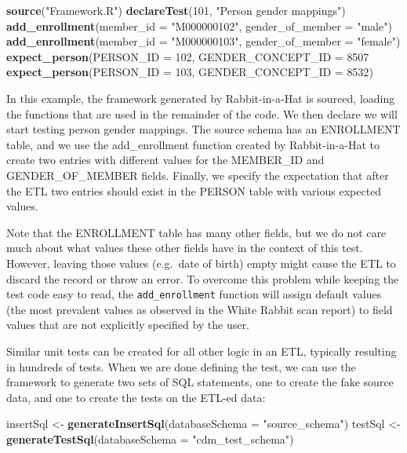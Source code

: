 \documentclass[11pt]{book}
\newenvironment{Shaded}{\begin{snugshade}}{\end{snugshade}}
\newcommand{\KeywordTok}[1]{\textcolor[rgb]{0.13,0.29,0.53}{\textbf{#1}}}
\newcommand{\DataTypeTok}[1]{\textcolor[rgb]{0.13,0.29,0.53}{#1}}
\newcommand{\DecValTok}[1]{\textcolor[rgb]{0.00,0.00,0.81}{#1}}
\newcommand{\StringTok}[1]{\textcolor[rgb]{0.31,0.60,0.02}{#1}}
\newcommand{\NormalTok}[1]{#1}
\theoremstyle{definition}
\theoremstyle{definition}
\theoremstyle{definition}
\theoremstyle{remark}
\begin{document}
\begin{Shaded}
\begin{Highlighting}[]
\KeywordTok{source}\NormalTok{(}\StringTok{"Framework.R"}\NormalTok{)}
\KeywordTok{declareTest}\NormalTok{(}\DecValTok{101}\NormalTok{, }\StringTok{"Person gender mappings"}\NormalTok{)}
\KeywordTok{add_enrollment}\NormalTok{(}\DataTypeTok{member_id =} \StringTok{"M000000102"}\NormalTok{, }\DataTypeTok{gender_of_member =} \StringTok{"male"}\NormalTok{)}
\KeywordTok{add_enrollment}\NormalTok{(}\DataTypeTok{member_id =} \StringTok{"M000000103"}\NormalTok{, }\DataTypeTok{gender_of_member =} \StringTok{"female"}\NormalTok{)}
\KeywordTok{expect_person}\NormalTok{(}\DataTypeTok{PERSON_ID =} \DecValTok{102}\NormalTok{, }\DataTypeTok{GENDER_CONCEPT_ID =} \DecValTok{8507}
\KeywordTok{expect_person}\NormalTok{(}\DataTypeTok{PERSON_ID =} \DecValTok{103}\NormalTok{, }\DataTypeTok{GENDER_CONCEPT_ID =} \DecValTok{8532}\NormalTok{)}
\end{Highlighting}
\end{Shaded}

In this example, the framework generated by Rabbit-in-a-Hat is sourced,
loading the functions that are used in the remainder of the code. We
then declare we will start testing person gender mappings. The source
schema has an ENROLLMENT table, and we use the add\_enrollment function
created by Rabbit-in-a-Hat to create two entries with different values
for the MEMBER\_ID and GENDER\_OF\_MEMBER fields. Finally, we specify
the expectation that after the ETL two entries should exist in the
PERSON table with various expected values.

Note that the ENROLLMENT table has many other fields, but we do not care
much about what values these other fields have in the context of this
test. However, leaving those values (e.g.~date of birth) empty might
cause the ETL to discard the record or throw an error. To overcome this
problem while keeping the test code easy to read, the
\texttt{add\_enrollment} function will assign default values (the most
prevalent values as observed in the White Rabbit scan report) to field
values that are not explicitly specified by the user.

Similar unit tests can be created for all other logic in an ETL,
typically resulting in hundreds of tests. When we are done defining the
test, we can use the framework to generate two sets of SQL statements,
one to create the fake source data, and one to create the tests on the
ETL-ed data:

\begin{Shaded}
\begin{Highlighting}[]
\NormalTok{insertSql <-}\StringTok{ }\KeywordTok{generateInsertSql}\NormalTok{(}\DataTypeTok{databaseSchema =} \StringTok{"source_schema"}\NormalTok{)}
\NormalTok{testSql <-}\StringTok{ }\KeywordTok{generateTestSql}\NormalTok{(}\DataTypeTok{databaseSchema =} \StringTok{"cdm_test_schema"}\NormalTok{)}
\end{Highlighting}
\end{Shaded}
\end{document}
